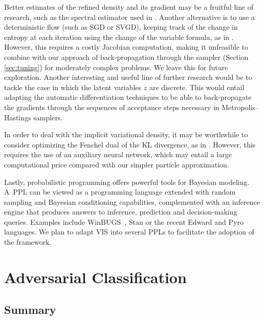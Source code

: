Better estimates of the refined density and its gradient may be a fruitful line of research, such as the spectral estimator used in \cite{shi2018spectral}. Another alternative is to use a deterministic flow (such as SGD or SVGD), keeping
track of the change in entropy at each iteration using the change of the variable formula, as in \cite{duvenaud2016early}. However, this requires a costly Jacobian computation, making it unfeasible to combine with our approach of back-propagation through the sampler (Section \ref{sec:tuning}) for moderately complex problems. We leave this for future exploration. {Another interesting and useful line of further research would be to tackle the case in which the latent variables $z$ are discrete. This would entail adapting the automatic differentiation techniques to be able to back-propagate the gradients through the sequences of acceptance steps necessary in Metropolis--Hastings samplers.}

In order to deal with the implicit variational density, it may be worthwhile to consider optimizing the Fenchel dual of the KL divergence, as
 in \cite{fang2019implicit}. However, this requires the use of an auxiliary neural network, which may entail a large computational price compared with our simpler particle approximation.

Lastly, probabilistic programming offers powerful tools for Bayesian modeling.
A~PPL can be viewed as a programming language extended with random sampling and Bayesian conditioning capabilities, complemented with an inference engine that produces answers to inference, prediction and decision-making queries. Examples 
include WinBUGS~\cite{lunn2000winbugs}, Stan \cite{carpenter2017stan} or the recent Edward \cite{tran2018simple} and Pyro \cite{bingham2018pyro} languages. We plan to adapt VIS into several PPLs to facilitate the adoption of the framework.


\section{Adversarial Classification}

\subsection{Summary}

